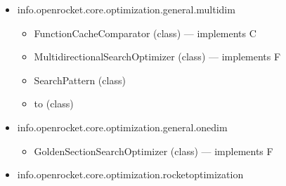 \documentclass{amsdtx}
\begin{document}
\begin{itemize}
\begin{itemize}
    \begin{itemize}
    
    \item
      Function (interface)
    \item
      FunctionCache (interface)
    \item
      FunctionCallable (class) --- implements C
    \item
      FunctionOptimizer (interface)
    \item
      OptimizationController (interface)
    \item
      OptimizationControllerDelegator (class) --- implements O
    \item
      OptimizationException (class) --- extends E
    \item
      ParallelExecutorCache (class) --- implements P
    \item
      ParallelFunctionCache (interface) --- extends F
    \item
      Point (class)
    \item
      defining (interface)
    \item
      for (interface)
    \item
      handles (class)
    \item
      is (class)
    \end{itemize}
  \item
    info.openrocket.core.optimization.general.multidim

    \begin{itemize}
    
    \item
      FunctionCacheComparator (class) --- implements C
    \item
      MultidirectionalSearchOptimizer (class) --- implements F
    \item
      SearchPattern (class)
    \item
      to (class)
    \end{itemize}
  \item
    info.openrocket.core.optimization.general.onedim

    \begin{itemize}
    
    \item
      GoldenSectionSearchOptimizer (class) --- implements F
    \end{itemize}
  \item
    info.openrocket.core.optimization.rocketoptimization


\end{itemize}
\end{itemize}
\end{document}
